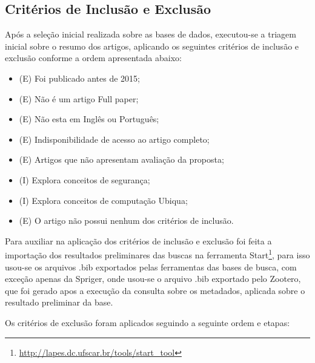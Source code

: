 \documentclass[tid,table]{texufpel} %
\begin{document}
\subsection{Critérios de Inclusão e Exclusão}
Após a seleção inicial realizada sobre as bases de dados, executou-se a triagem inicial sobre o resumo dos artigos, aplicando os seguintes critérios de inclusão e exclusão conforme a ordem apresentada abaixo: 
\begin{itemize}
	\item (E) Foi publicado antes de 2015;
	\item (E) Não é um artigo Full paper;
	\item (E) Não esta em Inglês ou Português;
	\item (E) Indisponibilidade de acesso ao artigo completo;
	\item (E) Artigos que não apresentam avaliação da proposta;
	\item (I) Explora conceitos de segurança;
	\item (I) Explora conceitos de computação Ubiqua;
	\item (E) O artigo não possui nenhum dos critérios de inclusão.
\end{itemize}
	
Para auxiliar na aplicação dos critérios de inclusão e exclusão foi feita a importação dos resultados preliminares das buscas na ferramenta Start\footnote{\url{http://lapes.dc.ufscar.br/tools/start_tool}},
para isso usou-se os arquivos .bib exportados pelas ferramentas das bases de busca, com exceção apenas da Spriger, onde usou-se o arquivo .bib exportado pelo Zootero, que foi gerado apos a execução da consulta sobre os metadados, aplicada sobre o resultado preliminar da base.

Os critérios de exclusão foram aplicados seguindo a seguinte ordem e etapas:
\end{document}
